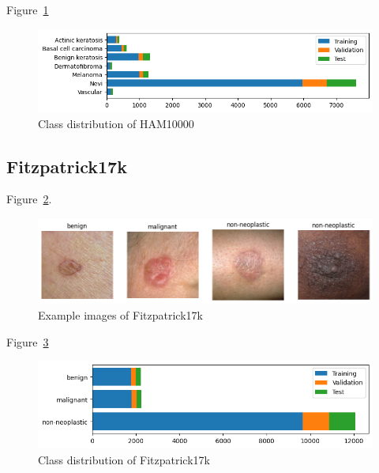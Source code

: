 Figure~\ref{fig:class_distribution_of_ham10000}

\begin{figure}[H]
    \begin{center}
    \includegraphics[width=15cm]{../images/class_distribution_of_ham10000.png}
    \caption{Class distribution of HAM10000}
   \label{fig:class_distribution_of_ham10000}
    \end{center}
\end{figure}
\subsection{Fitzpatrick17k}
Figure~\ref{fig:example_images_of_fitzpatrick17k}.

\begin{figure}[H]
    \begin{center}
    \includegraphics[width=15cm]{../images/example_images_of_fitzpatrick17k.png}
    \caption{Example images of Fitzpatrick17k}
   \label{fig:example_images_of_fitzpatrick17k}
    \end{center}
\end{figure}

Figure~\ref{fig:class_distribution_of_fitzpatrick17k}

\begin{figure}[H]
    \begin{center}
    \includegraphics[width=15cm]{../images/class_distribution_of_fitzpatrick17k.png}
    \caption{Class distribution of Fitzpatrick17k}
   \label{fig:class_distribution_of_fitzpatrick17k}
    \end{center}
\end{figure}


